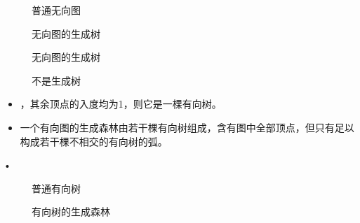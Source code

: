 \begin{frame}\ft{\subsubsecname}
\begin{figure}
\centering

\caption{普通无向图}
\end{figure}
\end{frame}

\begin{frame}\ft{\subsubsecname}
\begin{figure}
\centering

\caption{无向图的生成树}
\end{figure}
\end{frame}


\begin{frame}\ft{\subsubsecname}
\begin{figure}
\centering

\caption{无向图的生成树}
\end{figure}
\end{frame}

\begin{frame}\ft{\subsubsecname}
\begin{figure}
\centering

\caption{不是生成树}
\end{figure}
\end{frame}


\begin{frame}\ft{\subsubsecname}
\begin{dingyi}[有向树的生成森林]
\begin{itemize}
\item{}，其余顶点的入度均为1，则它是一棵有向树。\\[0.1in]
\item
一个有向图的生成森林由若干棵有向树组成，含有图中全部顶点，但只有足以构成若干棵不相交的有向树的弧。
\end{itemize}•
\end{dingyi}
\end{frame}


\begin{frame}\ft{\subsubsecname}
\begin{figure}
\centering

\caption{普通有向树}
\end{figure}
\end{frame}

\begin{frame}\ft{\subsubsecname}
\begin{figure}
\centering

\caption{有向树的生成森林}
\end{figure}
\end{frame}


